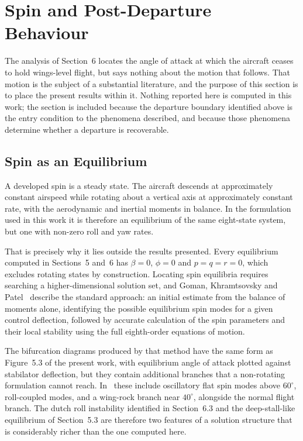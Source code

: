 \documentclass[
bindingoffset=5mm,  %
footnoteindent=3mm, %
hyphenation=true    %
]{src/wut-thesis}
\begin{document}
 \section{Spin and Post-Departure Behaviour}
 \label{sec:spin}
 
 The analysis of Section~6 locates the angle of attack at which the aircraft
 ceases to hold wings-level flight, but says nothing about the motion that
 follows. That motion is the subject of a substantial literature, and the
 purpose of this section is to place the present results within it. Nothing
 reported here is computed in this work; the section is included because the
 departure boundary identified above is the entry condition to the phenomena
 described, and because those phenomena determine whether a departure is
 recoverable.
 
 \subsection{Spin as an Equilibrium}
 
 A developed spin is a steady state. The aircraft descends at approximately
 constant airspeed while rotating about a vertical axis at approximately
 constant rate, with the aerodynamic and inertial moments in balance. In the
 formulation used in this work it is therefore an equilibrium of the same
 eight-state system, but one with non-zero roll and yaw rates.
 
 That is precisely why it lies outside the results presented. Every
 equilibrium computed in Sections~5 and~6 has $\beta = 0$, $\phi = 0$ and
 $p = q = r = 0$, which excludes rotating states by construction. Locating spin
 equilibria requires searching a higher-dimensional solution set, and Goman,
 Khramtsovsky and Patel~\cite{goman2003} describe the standard approach: an
 initial estimate from the balance of moments alone, identifying the possible
 equilibrium spin modes for a given control deflection, followed by accurate
 calculation of the spin parameters and their local stability using the full
 eighth-order equations of motion.
 
 The bifurcation diagrams produced by that method have the same form as
 Figure~5.3 of the present work, with equilibrium angle of attack plotted
 against stabilator deflection, but they contain additional branches that a
 non-rotating formulation cannot reach. In~\cite{goman2003} these include
 oscillatory flat spin modes above $60^{\circ}$, roll-coupled modes, and a
 wing-rock branch near $40^{\circ}$, alongside the normal flight branch. The
 dutch roll instability identified in Section~6.3 and the deep-stall-like
 equilibrium of Section~5.3 are therefore two features of a solution structure
 that is considerably richer than the one computed here.
 
\end{document}
